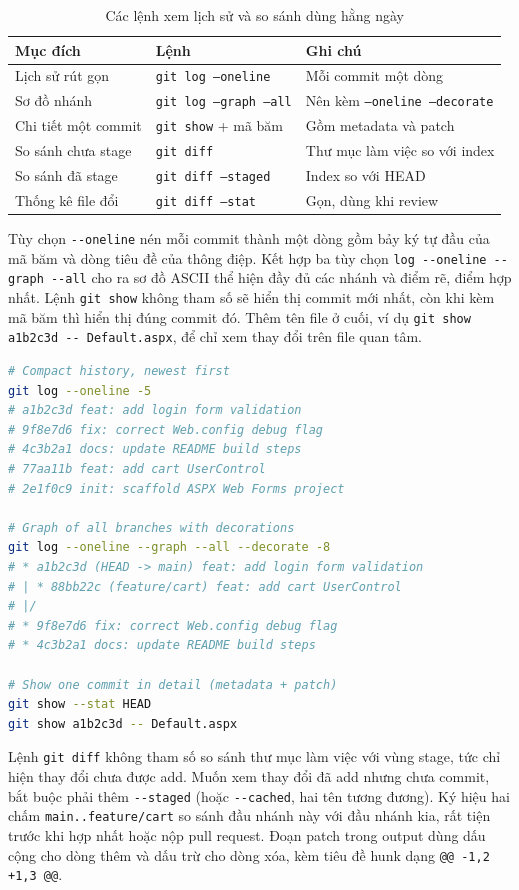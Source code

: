 \begin{table}[H]
\centering
\caption{Các lệnh xem lịch sử và so sánh dùng hằng ngày}
\label{tab:c22-log}
\begin{tabular}{lll}
\toprule
Mục đích & Lệnh & Ghi chú \\
\midrule
Lịch sử rút gọn & \texttt{git log --oneline} & Mỗi commit một dòng \\
Sơ đồ nhánh & \texttt{git log --graph --all} & Nên kèm \texttt{--oneline --decorate} \\
Chi tiết một commit & \texttt{git show} + mã băm & Gồm metadata và patch \\
So sánh chưa stage & \texttt{git diff} & Thư mục làm việc so với index \\
So sánh đã stage & \texttt{git diff --staged} & Index so với HEAD \\
Thống kê file đổi & \texttt{git diff --stat} & Gọn, dùng khi review \\
\bottomrule
\end{tabular}
\end{table}

Tùy chọn \verb|--oneline| nén mỗi commit thành một dòng gồm bảy ký tự đầu của mã băm và dòng tiêu đề của thông điệp.
Kết hợp ba tùy chọn \verb|log --oneline --graph --all| cho ra sơ đồ ASCII thể hiện đầy đủ các nhánh và điểm rẽ, điểm hợp nhất.
Lệnh \verb|git show| không tham số sẽ hiển thị commit mới nhất, còn khi kèm mã băm thì hiển thị đúng commit đó.
Thêm tên file ở cuối, ví dụ \verb|git show a1b2c3d -- Default.aspx|, để chỉ xem thay đổi trên file quan tâm.

\begin{lstlisting}[language=bash]
# Compact history, newest first
git log --oneline -5
# a1b2c3d feat: add login form validation
# 9f8e7d6 fix: correct Web.config debug flag
# 4c3b2a1 docs: update README build steps
# 77aa11b feat: add cart UserControl
# 2e1f0c9 init: scaffold ASPX Web Forms project

# Graph of all branches with decorations
git log --oneline --graph --all --decorate -8
# * a1b2c3d (HEAD -> main) feat: add login form validation
# | * 88bb22c (feature/cart) feat: add cart UserControl
# |/
# * 9f8e7d6 fix: correct Web.config debug flag
# * 4c3b2a1 docs: update README build steps

# Show one commit in detail (metadata + patch)
git show --stat HEAD
git show a1b2c3d -- Default.aspx
\end{lstlisting}

Lệnh \verb|git diff| không tham số so sánh thư mục làm việc với vùng stage, tức chỉ hiện thay đổi chưa được add.
Muốn xem thay đổi đã add nhưng chưa commit, bắt buộc phải thêm \verb|--staged| (hoặc \verb|--cached|, hai tên tương đương).
Ký hiệu hai chấm \verb|main..feature/cart| so sánh đầu nhánh này với đầu nhánh kia, rất tiện trước khi hợp nhất hoặc nộp pull request.
Đoạn patch trong output dùng dấu cộng cho dòng thêm và dấu trừ cho dòng xóa, kèm tiêu đề hunk dạng \verb|@@ -1,2 +1,3 @@|.

